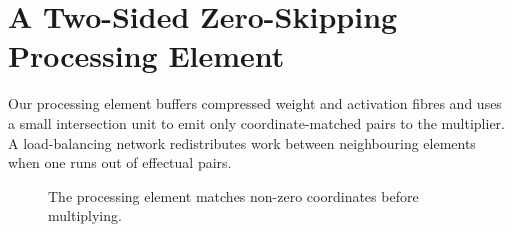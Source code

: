 \chapter{A Two-Sided Zero-Skipping Processing Element}
\label{ch:design}

Our processing element buffers compressed weight and activation fibres and uses a small
intersection unit to emit only coordinate-matched pairs to the multiplier. A load-balancing
network redistributes work between neighbouring elements when one runs out of effectual pairs.

\begin{figure}[htbp]
  \centering
  \caption{The processing element matches non-zero coordinates before multiplying.}
  \label{fig:pe}
\end{figure}
